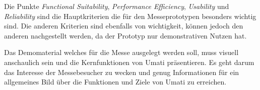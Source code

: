 \documentclass[a4paper, 12pt, oneside]{scrbook}
\begin{document}
	Die Punkte \textit{Functional Suitability}, \textit{Performance Efficiency}, \textit{Usability} und \textit{Reliability} sind die Hauptkriterien die für den Messeprototypen besonders wichtig sind. Die anderen Kriterien sind ebenfalls von wichtigkeit, können jedoch den anderen nachgestellt werden, da der Prototyp nur demonstrativen Nutzen hat. 
	
	
	Das Demomaterial welches für die Messe ausgelegt werden soll, muss visuell anschaulich sein und die Kernfunktionen von Umati präsentieren. Es geht darum das Interesse der Messebesucher zu wecken und genug Informationen für ein allgemeines Bild über die Funktionen und Ziele von Umati zu erreichen. 
	
	
	
	
	
	
\end{document}
